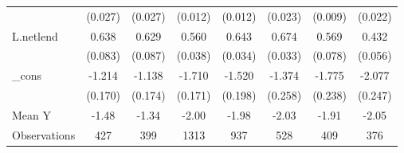 {\begin{tabular}{l*{7}{c}}
            &     (0.027)         &     (0.027)         &     (0.012)         &     (0.012)         &     (0.023)         &     (0.009)         &     (0.022)         \\
\addlinespace
L.netlend   &       0.638\sym{***}&       0.629\sym{***}&       0.560\sym{***}&       0.643\sym{***}&       0.674\sym{***}&       0.569\sym{***}&       0.432\sym{***}\\
            &     (0.083)         &     (0.087)         &     (0.038)         &     (0.034)         &     (0.033)         &     (0.078)         &     (0.056)         \\
\addlinespace
\_cons      &      -1.214\sym{***}&      -1.138\sym{***}&      -1.710\sym{***}&      -1.520\sym{***}&      -1.374\sym{***}&      -1.775\sym{***}&      -2.077\sym{***}\\
            &     (0.170)         &     (0.174)         &     (0.171)         &     (0.198)         &     (0.258)         &     (0.238)         &     (0.247)         \\
\midrule
Mean Y      &       -1.48         &       -1.34         &       -2.00         &       -1.98         &       -2.03         &       -1.91         &       -2.05         \\
Observations&         427         &         399         &        1313         &         937         &         528         &         409         &         376         \\
\bottomrule
\end{tabular}
}
